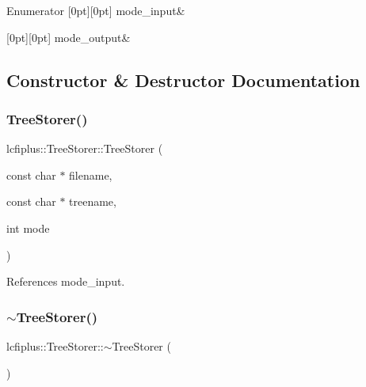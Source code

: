 \begin{DoxyEnumFields}{Enumerator}
[0pt][0pt]{}\mbox{\label{classlcfiplus_1_1TreeStorer_a2b1811610d569ece9ec4023e247fee65abe9badc2a38155aab24a868b6fe79f06}} 
mode\+\_\+input&\\
\hline

[0pt][0pt]{}\mbox{\label{classlcfiplus_1_1TreeStorer_a2b1811610d569ece9ec4023e247fee65a9846ce60b89c073e1053775d4aa8d4de}} 
mode\+\_\+output&\\
\hline

\end{DoxyEnumFields}


\subsection{Constructor \& Destructor Documentation}
\mbox{\label{classlcfiplus_1_1TreeStorer_a5ddc66668052b9c3ccae47b66e3e58bb}} 
\subsubsection{Tree\+Storer()}
{\footnotesize\ttfamily lcfiplus\+::\+Tree\+Storer\+::\+Tree\+Storer (\begin{DoxyParamCaption}\item[{const char $\ast$}]{filename,  }\item[{const char $\ast$}]{treename,  }\item[{int}]{mode }\end{DoxyParamCaption})}



References mode\+\_\+input.

\mbox{\label{classlcfiplus_1_1TreeStorer_a52d436143586a42c1db0f6dc2207d922}} 
\subsubsection{$\sim$\+Tree\+Storer()}
{\footnotesize\ttfamily lcfiplus\+::\+Tree\+Storer\+::$\sim$\+Tree\+Storer (\begin{DoxyParamCaption}{ }\end{DoxyParamCaption})\hspace{0.3cm}{\ttfamily [virtual]}}



